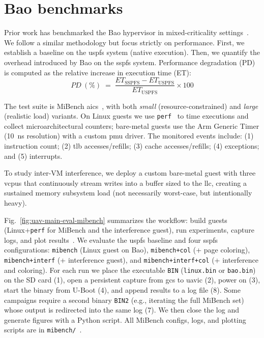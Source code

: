 \section{Bao benchmarks}
\label{sec:bao-benchmarks}
Prior work has benchmarked the Bao hypervisor in mixed-criticality settings~\cite{martins2023shedding,costaIRQColoring2023}. We follow a similar methodology but focus strictly on performance. First, we establish a baseline on the \gls{uspfs} system (native execution). Then, we quantify the overhead introduced by Bao on the \gls{sspfs} system. Performance degradation (PD) is computed as the relative increase in execution time (ET):
\begin{equation}
  \label{eq:perform-deg}
  PD~(\%) \;=\;
  \frac{ET_{\text{SSPFS}} - ET_{\text{USPFS}}}{ET_{\text{USPFS}}}\times 100
\end{equation}

The test suite is MiBench \gls{aics}~\cite{guthaus2001mibench}, with both \emph{small} (resource-constrained) and \emph{large} (realistic load) variants. On Linux guests we use \lstinline{perf}~\cite{perfLinux} to time executions and collect microarchitectural counters; bare-metal guests use the Arm Generic Timer (10~ns resolution) with a custom \gls{pmu} driver. The monitored events include: (1) instruction count; (2) \gls{tlb} accesses/refills; (3) cache accesses/refills; (4) exceptions; and (5) interrupts.

To study inter-VM interference, we deploy a custom bare-metal guest with three \glspl{vcpu} that continuously stream writes into a buffer sized to the \gls{llc}, creating a sustained memory subsystem load (not necessarily worst-case, but intentionally heavy).

Fig.~\ref{fig:uav-main-eval-mibench} summarizes the workflow: build guests (Linux+\lstinline{perf} for MiBench and the interference guest), run experiments, capture logs, and plot results~\cite{shedlightRepo}. We evaluate the \gls{uspfs} baseline and four \gls{sspfs} configurations:
\lstinline{mibench} (Linux guest on Bao),
\lstinline{mibench+col} (+ page coloring),
\lstinline{mibench+interf} (+ interference guest),
and \lstinline{mibench+interf+col} (+ interference and coloring).
For each run we place the executable \lstinline{BIN} (\lstinline{linux.bin} or \lstinline{bao.bin}) on the SD card (1), open a persistent capture from \gls{gcs} to \gls{uavic} (2), power on (3), start the binary from U-Boot (4), and append results to a log file (8). Some campaigns require a second binary \lstinline{BIN2} (e.g., iterating the full MiBench set) whose output is redirected into the same log (7). We then close the log and generate figures with a Python script. All MiBench configs, logs, and plotting scripts are in \lstinline{mibench/}~\cite{thesis-sw-github}.

